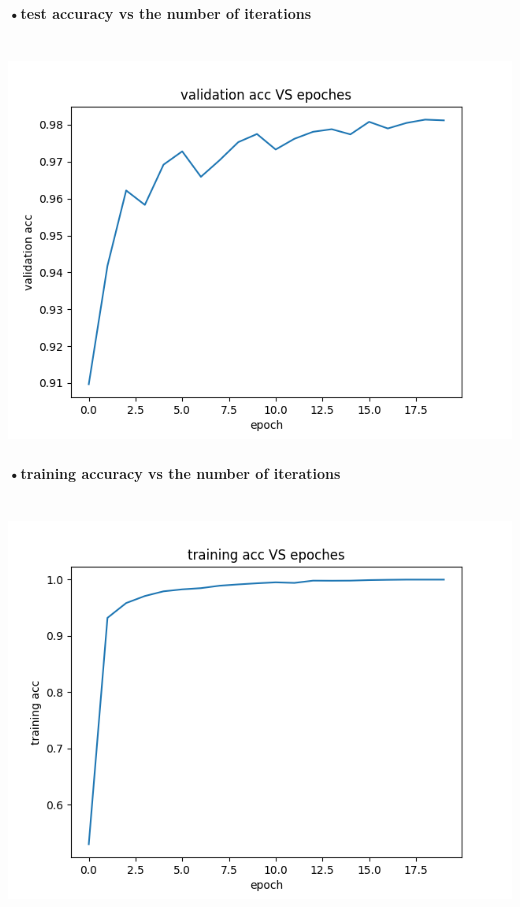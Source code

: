 \documentclass[11pt]{article} %
\begin{document}
\paragraph{•test accuracy vs the number of iterations}\mbox{}\\
\includegraphics[scale=0.5]{e121.png}
\paragraph{•training accuracy vs the number of iterations}\mbox{}\\
\includegraphics[scale=0.5]{e122.png}
\end{document}
